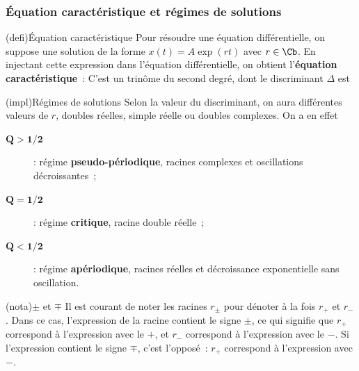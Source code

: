 \documentclass[../../main/main.tex]{subfiles}
\begin{document}
\subsubsection{Équation caractéristique et régimes de solutions}
\begin{tcb}[label=def:eqcarac, sidebyside](defi){Équation caractéristique}
	Pour résoudre une équation différentielle, on suppose une solution de la
	forme $x(t) = A\exp(rt)$ avec $r \in \Cb$. En injectant cette
	expression dans l'équation différentielle, on obtient l'\textbf{équation
		caractéristique}~:
	\tcblower
	C'est un trinôme du second degré, dont le discriminant $\Delta$ est
\end{tcb}
\begin{tcb}[label=impl:eqcarac](impl){Régimes de solutions}
	Selon la valeur du discriminant, on aura différentes valeurs de $r$,
	doubles réelles, simple réelle ou doubles complexes. On a en effet
	\vspace{-15pt}
	\begin{description}
		\item[$\mathbf{Q > 1/2}$] : régime \textbf{pseudo-périodique},
			racines complexes et oscillations décroissantes~;
		\item[$\mathbf{Q = 1/2}$] : régime \textbf{critique}, racine double
			réelle~;
		\item[$\mathbf{Q < 1/2}$] : régime \textbf{apériodique}, racines
			réelles et décroissance exponentielle sans oscillation.
	\end{description}
\end{tcb}

\begin{tcb}[label=nota:pm](nota){$\pm$ et $\mp$}
	Il est courant de noter les racines $r_\pm$ pour dénoter à la fois $r_+$ et
	$r_-$. Dans ce cas, l'expression de la racine contient le signe $\pm$, ce
	qui signifie que $r_+$ correspond à l'expression avec le $+$, et $r_-$
	correspond à l'expression avec le $-$.
	\smallbreak
	Si l'expression contient le signe $\mp$, c'est l'opposé~: $r_+$ correspond à
	l'expression avec $-$.
\end{tcb}
\end{document}
